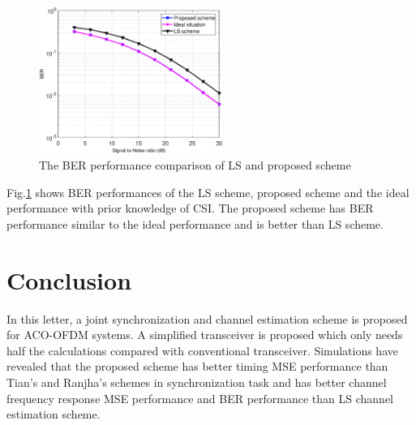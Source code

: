 \documentclass[10pt,journal]{IEEEtran}
\begin{document}

    \begin{figure}[!htb]
        \setlength{\abovecaptionskip}{10pt}
        \captionsetup{belowskip=-10pt}
    	\centering \includegraphics[width=6cm]{channel_estimation_BER.eps}
		\caption{The BER performance comparison of LS and proposed scheme} \label{fig:channel_estimation_BER}
    \end{figure}

	Fig.\ref{fig:channel_estimation_BER} shows BER performances of the LS scheme, proposed scheme and the ideal performance with prior knowledge of CSI. The proposed scheme has BER performance similar to the ideal performance and is better than LS scheme.


\section{Conclusion}
In this letter, a joint synchronization and channel estimation scheme is proposed for ACO-OFDM systems. A simplified transceiver is proposed which only needs half the calculations compared with conventional transceiver. Simulations have revealed that the proposed scheme has better timing MSE performance than Tian's and Ranjha's schemes in synchronization task and has better channel frequency response MSE performance and BER performance than LS channel estimation scheme.


\scriptsize{}
\end{document}
